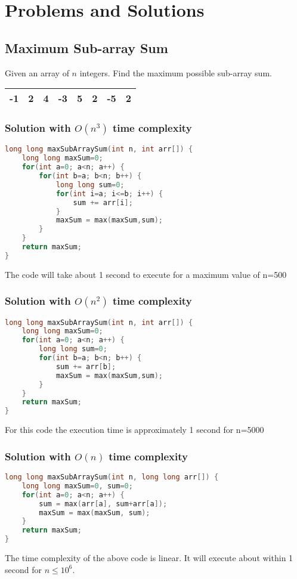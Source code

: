 \newpage
\chapter{Problems and Solutions}

\section{Maximum Sub-array Sum}
Given an array of $n$ integers. Find the maximum possible sub-array sum.
\begin{center}
\begin{tabular}{|c|c|c|c|c|c|c|c|}
	\hline
	-1 &\cellcolor[gray]{0.7}2 &\cellcolor[gray]{0.7}4 &\cellcolor[gray]{0.7}-3 &\cellcolor[gray]{0.7}5 &\cellcolor[gray]{0.7}2 & -5 & 2\\
	\hline
\end{tabular}
\end{center}

\subsection{Solution with $O(n^3)$ time complexity}
\begin{lstlisting}[language=c++]
long long maxSubArraySum(int n, int arr[]) {
    long long maxSum=0;
    for(int a=0; a<n; a++) {
        for(int b=a; b<n; b++) {
            long long sum=0;
            for(int i=a; i<=b; i++) {
                sum += arr[i];
            }
            maxSum = max(maxSum,sum);
        }
    }
    return maxSum;
}
\end{lstlisting}
The code will take about 1 second to execute for a maximum value of n=500


\subsection{Solution with $O(n^2)$ time complexity}
\begin{lstlisting}[language=c++]
long long maxSubArraySum(int n, int arr[]) {
    long long maxSum=0;
    for(int a=0; a<n; a++) {
        long long sum=0;
        for(int b=a; b<n; b++) {
            sum += arr[b];
            maxSum = max(maxSum,sum);
        }
    }
    return maxSum;
}
\end{lstlisting}
For this code the execution time is approximately 1 second for n=5000


\subsection{Solution with $O(n)$ time complexity}
\begin{lstlisting}[language=c++]
long long maxSubArraySum(int n, long long arr[]) {
    long long maxSum=0, sum=0;
    for(int a=0; a<n; a++) {
        sum = max(arr[a], sum+arr[a]);
        maxSum = max(maxSum, sum);
    }
    return maxSum;
}
\end{lstlisting}
The time complexity of the above code is linear. It will execute about within 1 second for $n\leq 10^6$.
